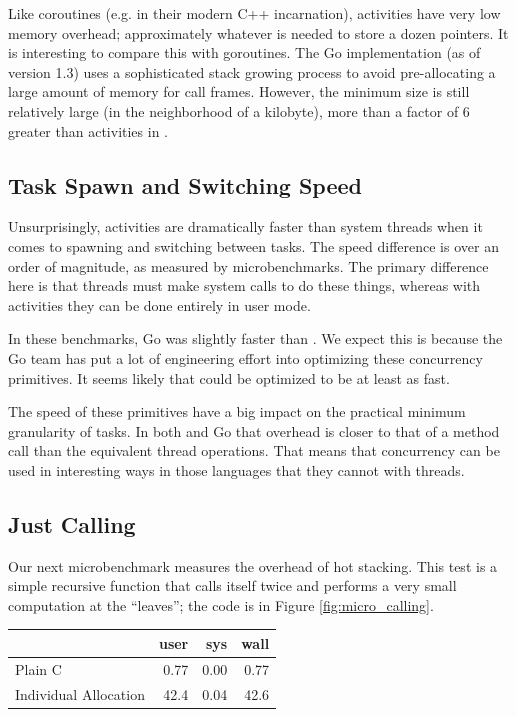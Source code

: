 \documentclass[sigplan,10pt,review,anonymous]{acmart}\settopmatter{printfolios=true,printccs=false,printacmref=false}
\begin{document}
Like coroutines (e.g. in their modern C++ incarnation), activities have very low memory overhead; approximately whatever is needed to store a dozen pointers.
It is interesting to compare this with goroutines.
The Go implementation (as of version 1.3) uses a sophisticated stack growing process to avoid pre-allocating a large amount of memory for call frames.
However, the minimum size is still relatively large (in the neighborhood of a kilobyte), more than a factor of 6 greater than activities in \charcoal{}.

\subsection{Task Spawn and Switching Speed}

Unsurprisingly, activities are dramatically faster than system threads when it comes to spawning and switching between tasks.
The speed difference is over an order of magnitude, as measured by microbenchmarks.
The primary difference here is that threads must make system calls to do these things, whereas with activities they can be done entirely in user mode.

In these benchmarks, Go was slightly faster than \charcoal{}.
We expect this is because the Go team has put a lot of engineering effort into optimizing these concurrency primitives.
It seems likely that \charcoal{} could be optimized to be at least as fast.

The speed of these primitives have a big impact on the practical minimum granularity of tasks.
In both \charcoal{} and Go that overhead is closer to that of a method call than the equivalent thread operations.
That means that concurrency can be used in interesting ways in those languages that they cannot with threads.

\subsection{Just Calling}

Our next microbenchmark measures the overhead of hot stacking.
This test is a simple recursive function that calls itself twice and performs a very small computation at the ``leaves''; the code is in Figure \ref{fig:micro_calling}.

\vspace{1em}
\begin{tabular}{|l|r|r|r|}
  \hline
   & user & sys & wall \\
  \hline
  \hline
  Plain C & 0.77 & 0.00 & 0.77 \\
  \hline
  Individual Allocation & 42.4 & 0.04 & 42.6 \\
  \hline
\end{tabular}
\vspace{1em}
\end{document}
